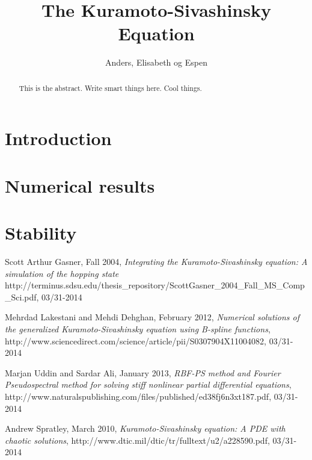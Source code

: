 \documentclass[10pt,a4paper]{article}
\begin{document}
\title{The Kuramoto-Sivashinsky Equation}
\author{Anders, Elisabeth og Espen}

\maketitle


\begin{abstract}
This is the abstract. Write smart things here. Cool things.
\end{abstract}



\section*{Introduction}


\section*{Numerical results}


\section*{Stability}






\begin{thebibliography}{9}

Scott Arthur Gasner, Fall 2004,
\emph{Integrating the Kuramoto-Sivashinsky equation: A simulation of the hopping state}
http://terminus.sdsu.edu/thesis\_repository/ScottGasner\_2004\_Fall\_MS\_Comp\_Sci.pdf, 03/31-2014

Mehrdad Lakestani and Mehdi Dehghan, February 2012,
\emph{Numerical solutions of the generalized Kuramoto-Sivashinsky equation using B-spline functions},
http://www.sciencedirect.com/science/article/pii/S0307904X11004082, 03/31-2014

Marjan Uddin and Sardar Ali, January 2013,
\emph{RBF-PS method and Fourier Pseudospectral method for solving stiff 
nonlinear partial differential equations},
http://www.naturalspublishing.com/files/published/ed38fj6n3xt187.pdf, 03/31-2014

Andrew Spratley, March 2010,
\emph{Kuramoto-Sivashinsky equation: A PDE with chaotic solutions},
http://www.dtic.mil/dtic/tr/fulltext/u2/a228590.pdf, 03/31-2014

\end{thebibliography}
\end{document}

